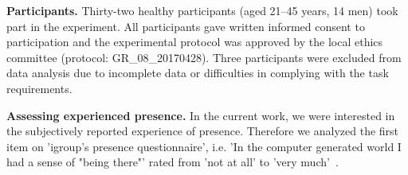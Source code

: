 \indent \textbf{Participants.} Thirty-two healthy participants (aged 21--45 years, 14 men) took part in the
experiment. All participants gave written informed consent to participation and the experimental protocol was approved by the local ethics committee (protocol: GR\_08\_20170428). Three participants were excluded from data analysis due to incomplete data or difficulties in complying with the task requirements.

\indent \textbf{Assessing experienced presence.} In the current work, we were interested in the subjectively reported experience of presence. Therefore we analyzed the first item on 'igroup's presence questionnaire', i.e. 'In the computer generated world I had a sense of "being there"' rated from 'not at all' to 'very much'~\cite{ipq, slaterQ1}.
